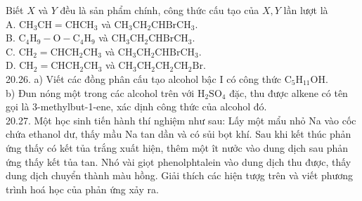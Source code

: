 \documentclass[10pt]{article}
\begin{document}
Biết $X$ và $Y$ đều là sản phẩm chính, công thức cấu tạo của $X, Y$ lần lượt là\\
A. $\mathrm{CH}_{3} \mathrm{CH}=\mathrm{CHCH}_{3}$ và $\mathrm{CH}_{3} \mathrm{CH}_{2} \mathrm{CHBrCH}_{3}$.\\
B. $\mathrm{C}_{4} \mathrm{H}_{9}-\mathrm{O}-\mathrm{C}_{4} \mathrm{H}_{9}$ và $\mathrm{CH}_{3} \mathrm{CH}_{2} \mathrm{CHBrCH}_{3}$.\\
C. $\mathrm{CH}_{2}=\mathrm{CHCH}_{2} \mathrm{CH}_{3}$ và $\mathrm{CH}_{3} \mathrm{CH}_{2} \mathrm{CHBrCH}_{3}$.\\
D. $\mathrm{CH}_{2}=\mathrm{CHCH}_{2} \mathrm{CH}_{3}$ và $\mathrm{CH}_{3} \mathrm{CH}_{2} \mathrm{CH}_{2} \mathrm{CH}_{2} \mathrm{Br}$.\\
20.26. a) Viết các đồng phân cấu tạo alcohol bậc I có công thức $\mathrm{C}_{5} \mathrm{H}_{11} \mathrm{OH}$.\\
b) Đun nóng một trong các alcohol trên với $\mathrm{H}_{2} \mathrm{SO}_{4}$ đặc, thu được alkene có tên gọi là 3-methylbut-1-ene, xác dịnh công thức của alcohol đó.\\
20.27. Một học sinh tiến hành thí nghiệm như sau: Lấy một mẩu nhỏ Na vào cốc chứa ethanol dư, thấy mầu Na tan dần và có sủi bọt khí. Sau khi kết thúc phản ứng thấy có kết tủa trắng xuất hiện, thêm một ît nưởc vào dung dịch sau phản ứng thấy kết tủa tan. Nhó vài giọt phenolphtalein vào dung dịch thu được, thấy dung dịch chuyển thành màu hồng. Giải thích các hiện tượg trên và viết phương trình hoá học của phản ứng xảy ra.
\end{document}

